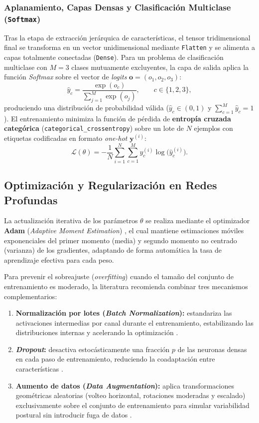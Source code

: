 \subsubsection{Aplanamiento, Capas Densas y Clasificación Multiclase (\texttt{Softmax})}
Tras la etapa de extracción jerárquica de características, el tensor tridimensional final se transforma en un vector unidimensional mediante \texttt{Flatten} y se alimenta a capas totalmente conectadas (\texttt{Dense}). Para un problema de clasificación multiclase con $M = 3$ clases mutuamente excluyentes, la capa de salida aplica la función \textit{Softmax} sobre el vector de \textit{logits} $\mathbf{o} = (o_1, o_2, o_3)$:
\begin{equation}
    \hat{y}_c = \frac{\exp(o_c)}{\sum_{j=1}^{M} \exp(o_j)}, \qquad c \in \{1, 2, 3\},
\end{equation}
produciendo una distribución de probabilidad válida ($\hat{y}_c \in (0,1)$ y $\sum_{c=1}^{M} \hat{y}_c = 1$). El entrenamiento minimiza la función de pérdida de \textbf{entropía cruzada categórica} (\texttt{categorical\_crossentropy}) sobre un lote de $N$ ejemplos con etiquetas codificadas en formato \textit{one-hot} $\mathbf{y}^{(i)}$:
\begin{equation}
    \mathcal{L}(\theta) = -\frac{1}{N} \sum_{i=1}^{N} \sum_{c=1}^{M} y^{(i)}_c \log\big(\hat{y}^{(i)}_c\big).
\end{equation}

\subsection{Optimización y Regularización en Redes Profundas}

La actualización iterativa de los parámetros $\theta$ se realiza mediante el optimizador \textbf{Adam} (\textit{Adaptive Moment Estimation}) \cite{Kingma2015}, el cual mantiene estimaciones móviles exponenciales del primer momento (media) y segundo momento no centrado (varianza) de los gradientes, adaptando de forma automática la tasa de aprendizaje efectiva para cada peso.

Para prevenir el sobreajuste (\textit{overfitting}) cuando el tamaño del conjunto de entrenamiento es moderado, la literatura recomienda combinar tres mecanismos complementarios:
\begin{enumerate}
    \item \textbf{Normalización por lotes (\textit{Batch Normalization}):} estandariza las activaciones intermedias por canal durante el entrenamiento, estabilizando las distribuciones internas y acelerando la optimización \cite{Ioffe2015}.
    \item \textbf{\textit{Dropout}:} desactiva estocásticamente una fracción $p$ de las neuronas densas en cada paso de entrenamiento, reduciendo la coadaptación entre características \cite{Srivastava2014}.
    \item \textbf{Aumento de datos (\textit{Data Augmentation}):} aplica transformaciones geométricas aleatorias (volteo horizontal, rotaciones moderadas y escalado) exclusivamente sobre el conjunto de entrenamiento para simular variabilidad postural sin introducir fuga de datos \cite{Chollet2021}.
\end{enumerate}

